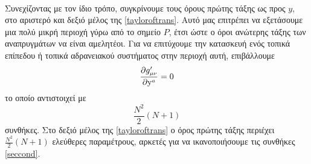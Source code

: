 \\

Συνεχίζοντας με τον ίδιο τρόπο, 
συγκρίνουμε τους όρους πρώτης τάξης ως προς $y$, στο αριστερό και δεξιό μέλος της \eqref{tayloroftrans}. %
Αυτό μας επιτρέπει να εξετάσουμε μια πολύ μικρή περιοχή γύρω από το σημείο $P$, έτσι ώστε ο όροι ανώτερης τάξης των αναπρυγμάτων να είναι αμελητέοι. Για να επιτύχουμε την κατασκευή ενός τοπικά επίπεδου ή τοπικά αδρανειακού συστήματος στην περιοχή αυτή, επιβάλλουμε
\begin{equation}\label{seccond}
     \pd{\g{\mu}{\nu}'}{\y\superscr{a}} = 0
\end{equation}
το οποίο αντιστοιχεί με 
\begin{equation}
     \frac{N^2}{2}(N+1)
\end{equation}
συνθήκες. 
Στο δεξιό μέλος της \eqref{tayloroftrans} ο όρος πρώτης τάξης περιέχει $\frac{N^2}{2}(N+1)$ ελεύθερες παραμέτρους, αρκετές  για να ικανοποιήσουμε τις συνθήκες \eqref{seccond}.
\\


